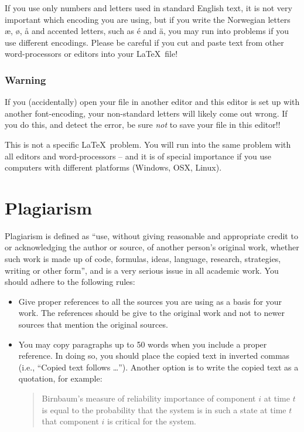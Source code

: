 If you use only numbers and letters used in standard English text, it is not very important which encoding you are using, but if you write the Norwegian letters æ, ø, å and accented letters, such as é and ä, you may run into problems if you use different encodings. Please be careful if you cut and paste text from other word-processors or editors into your \LaTeX\ file!

\subsubsection*{Warning}
If you (accidentally) open your file in another editor and this editor is set up with another font-encoding, your non-standard letters will likely come out wrong. If you do this, and detect the error, be sure \emph{not} to save your file in this editor!!

This is not a specific \LaTeX\ problem. You will run into the same problem with all editors and word-processors -- and it is of special importance if you use computers with different platforms (Windows, OSX, Linux).

\section{Plagiarism}
Plagiarism is defined as ``use, without giving reasonable and appropriate credit to or acknowledging the author or source, of another person's original work, whether such work is made up of code, formulas, ideas, language, research, strategies, writing or other form'', and is a very serious issue in all academic work. You should adhere to the following rules:
\begin{itemize}
\item Give proper references to all the sources you are using as a basis for your work. The references should be give to the original work and not to newer sources that mention the original sources.
\item You may copy paragraphs up to 50 words when you include a proper reference. In doing so, you should place the copied text in inverted commas (i.e., ``Copied text follows \ldots''). Another option is to write the copied text as a quotation, for example:
\begin{quote}
Birnbaum's measure of reliability importance of component $i$ at time $t$ is equal to the probability that the system is in such a state at time $t$ that component $i$ is critical for the system.\newline \mbox{} \hfill \citet{rausand04}
\end{quote}
\end{itemize}




